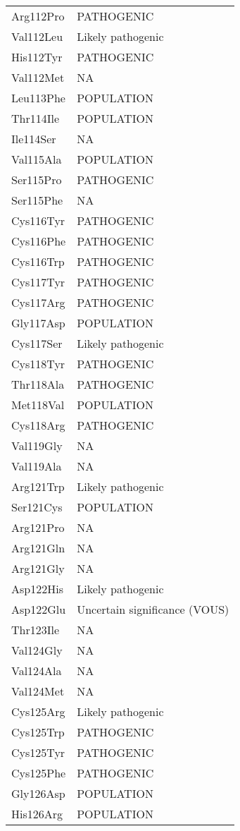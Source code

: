 \begin{longtable}[l]{l|l}
	Arg112Pro & PATHOGENIC \\
	Val112Leu & Likely pathogenic \\
	His112Tyr & PATHOGENIC \\
	Val112Met & NA \\
	Leu113Phe & POPULATION \\
	Thr114Ile & POPULATION \\
	Ile114Ser & NA \\
	Val115Ala & POPULATION \\
	Ser115Pro & PATHOGENIC \\
	Ser115Phe & NA \\
	Cys116Tyr & PATHOGENIC \\
	Cys116Phe & PATHOGENIC \\
	Cys116Trp & PATHOGENIC \\
	Cys117Tyr & PATHOGENIC \\
	Cys117Arg & PATHOGENIC \\
	Gly117Asp & POPULATION \\
	Cys117Ser & Likely pathogenic \\
	Cys118Tyr & PATHOGENIC \\
	Thr118Ala & PATHOGENIC \\
	Met118Val & POPULATION \\
	Cys118Arg & PATHOGENIC \\
	Val119Gly & NA \\
	Val119Ala & NA \\
	Arg121Trp & Likely pathogenic \\
	Ser121Cys & POPULATION \\
	Arg121Pro & NA \\
	Arg121Gln & NA \\
	Arg121Gly & NA \\
	Asp122His & Likely pathogenic \\
	Asp122Glu & Uncertain significance (VOUS) \\
	Thr123Ile & NA \\
	Val124Gly & NA \\
	Val124Ala & NA \\
	Val124Met & NA \\
	Cys125Arg & Likely pathogenic \\
	Cys125Trp & PATHOGENIC \\
	Cys125Tyr & PATHOGENIC \\
	Cys125Phe & PATHOGENIC \\
	Gly126Asp & POPULATION \\
	His126Arg & POPULATION \\

\end{longtable}
